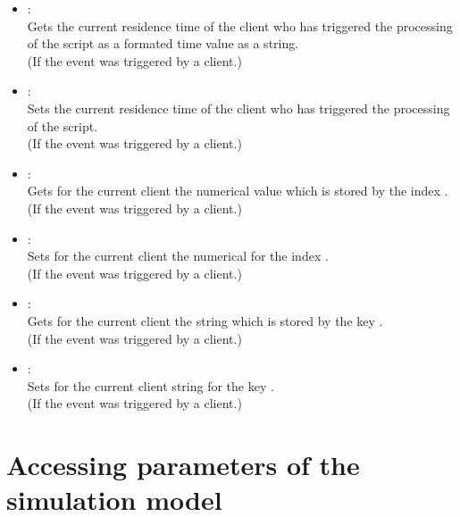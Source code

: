 \begin{itemize}
\item
{}:\\
Gets the current residence time of the client who has triggered the processing of the script as a formated time value as a string.\\
(If the event was triggered by a client.)

\item
{}:\\
Sets the current residence time of the client who has triggered the processing of the script.\\
(If the event was triggered by a client.)

\item
{}:\\
Gets for the current client the numerical value which is stored by the index .\\
(If the event was triggered by a client.)
  
\item
{}:\\
Sets for the current client the numerical  for the index .\\
(If the event was triggered by a client.)

\item
{}:\\
Gets for the current client the string which is stored by the key .\\
(If the event was triggered by a client.)
  
\item
{}:\\
Sets for the current client string  for the key .\\
(If the event was triggered by a client.)

\end{itemize}

\section{Accessing parameters of the simulation model}

